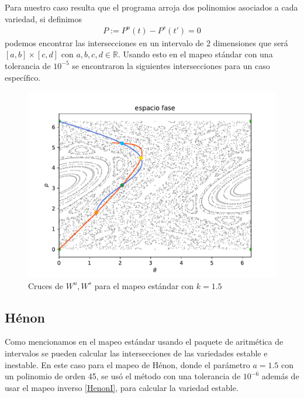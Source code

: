 Para nuestro caso resulta que el programa arroja dos polinomios asociados a cada variedad, si definimos 
\begin{eqnarray}
P:=P^{u}(t)-P^{s}(t')=0
\label{CorteV}
\end{eqnarray}
podemos encontrar las intersecciones en un intervalo de 2 dimensiones que será $[a,b]\times[c,d]$ con $a,b,c,d \in \mathbb{R}$. Usando esto en el mapeo stándar con una tolerancia de $10^{-5}$ se encontraron la siguientes intersecciones para un caso específico.
\begin{figure}[H]
\centering
\includegraphics[scale=0.4]{cruce_estandar}
\caption{Cruces de $W^{u},W^{s}$ para el mapeo estándar con $k=1.5$ }
\label{cruce_estandar}
\end{figure}







\subsection{Hénon}
Como mencionamos en el mapeo estándar usando el paquete de aritmética de intervalos se pueden calcular las intersecciones de las variedades estable e inestable. En este caso para el mapeo de Hénon, donde el parámetro $a=1.5$ con un polinomio de orden 45, se usó el método con una tolerancia de $10^{-6}$ además de usar el mapeo inverso \ref{HenonI}, para calcular la variedad estable. 
 
